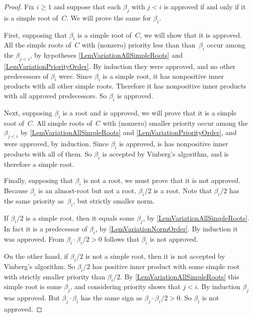 \documentclass[12pt]{amsart}
\numberwithin{theorem}{section}
\numberwithin{equation}{section}
\numberwithin{figure}{section}
\theoremstyle{remark}
\begin{document}
\begin{proof}
    Fix $i\geq1$ and suppose that each $\beta_j$ with $j<i$ is approved if and only
    if it is a simple root of~$C$.   We will prove the same for $\beta_i$.

    First, supposing that $\beta_i$ is a simple root of~$C$, we will show that it
    is approved.  All the simple roots of~$C$ with (nonzero) priority less
    than than~$\beta_i$
     occur among the $\beta_{j<i}$, 
    by hypotheses \eqref{LemVariationAllSimpleRoots} and \eqref{LemVariationPriorityOrder}.  By induction they
    were approved, and no other predecessors of $\beta_i$ were.  Since $\beta_i$
    is a simple root, it has nonpositive inner products with all other
    simple roots.  Therefore it has nonpositive inner products with all
    approved predecessors.  So $\beta_i$ is approved.

    Next, supposing $\beta_i$ is a root and is approved, we will prove that it
    is a simple root of~$C$.  
    All simple roots of~$C$ with (nonzero) smaller priority occur among the
    $\beta_{j<i}$ by \eqref{LemVariationAllSimpleRoots} and \eqref{LemVariationPriorityOrder}, and were approved, by induction.
    Since $\beta_i$ is approved, is has nonpositive inner products with all of them.
  So $\beta_i$ is
    accepted by Vinberg's algorithm, and is therefore a simple root.

    Finally, supposing that $\beta_i$ is not a root, we must prove that it is 
    not approved.  Because $\beta_i$ is an almost-root but not a root, 
    $\beta_i/2$ is a root.  
    Note that $\beta_i/2$ has the same priority as~$\beta_i$, but strictly smaller norm.
    
    If $\beta_i/2$ is a simple root, then it equals some $\beta_j$, by \eqref{LemVariationAllSimpleRoots}.
    In fact it is a predecessor of $\beta_i$, by \eqref{LemVariationNormOrder}.  By
    induction it was approved.  From $\beta_i\cdot \beta_i/2>0$ follows that $\beta_i$ is
    not approved.

    On the other hand, if $\beta_i/2$ is not a simple root, then it is not
    accepted by Vinberg's algorithm.  So $\beta_i/2$ has positive inner product
    with some simple root with strictly smaller priority than $\beta_i/2$.
    By \eqref{LemVariationAllSimpleRoots} this simple root is some $\beta_j$, and considering priority
    shows that $j<i$.  By induction $\beta_j$ was approved.  But $\beta_j\cdot \beta_i$ 
    has the same sign as $\beta_j\cdot \beta_i/2>0$.  So $\beta_i$ is
    not approved.
\end{proof}
\end{document}
